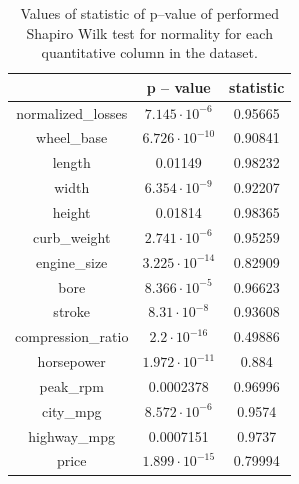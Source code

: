 \documentclass[11pt,a4paper]{article}\usepackage[]{graphicx}\usepackage[]{xcolor}
\begin{document}
		\begin{table}[ht]
			
			\centering
			
			\caption{Values of statistic of p--value of performed Shapiro Wilk test for normality for each quantitative column in the dataset.} %
			\begin{tabular}{|c |c |c|} %
				
				\hline %
				 & p -- value & statistic \\ [0.5ex] %
    \hline
				
         normalized\_losses & $7.145 \cdot 10^{-6}$ &  0.95665\\ \hline     
				wheel\_base & $ 6.726 \cdot 10^{-10}$  & 0.90841   \\ \hline
				length & 0.01149 &  0.98232 \\ \hline
				width & $6.354 \cdot 10^{-9}$ & 0.92207  \\ \hline
				height & 0.01814 & 0.98365 \\ \hline
				curb\_weight & $2.741 \cdot 10^{-6}$ & 0.95259\\ \hline
					engine\_size & $3.225 \cdot 10^{-14}$ &  0.82909\\ \hline
						bore & $ 8.366 \cdot 10^{-5}$ & 0.96623\\ \hline
							stroke & $8.31 \cdot 10^{-8}$ & 0.93608 \\ \hline
								compression\_ratio & $2.2 \cdot 10^{-16}$ & 0.49886 \\ \hline
									horsepower & $1.972 \cdot 10^{-11}$ & 0.884 \\ \hline
										peak\_rpm & 0.0002378 & 0.96996\\ \hline
											city\_mpg & $8.572 \cdot 10^{-6}$ & 0.9574\\ \hline
												highway\_mpg & 0.0007151 &  0.9737 \\ \hline
													price &$1.899 \cdot 10^{-15}$ &0.79994 \\ \hline
		

			\end{tabular}
			\label{table:shapiro} 
		\end{table}
		
\end{document}
